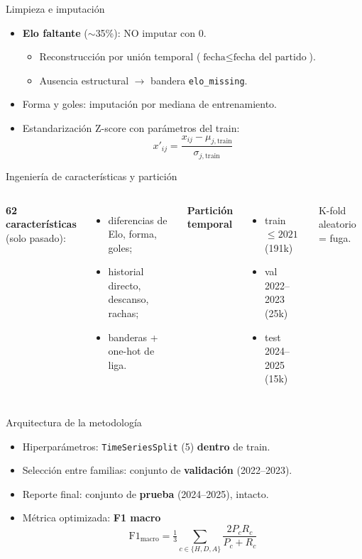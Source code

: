 \documentclass[aspectratio=169]{beamer}
\begin{document}
\begin{frame}{Limpieza e imputación}
  \begin{itemize}
    \item \textbf{Elo faltante} ($\sim$35\%): NO imputar con 0.
    \begin{itemize}
      \item Reconstrucción por unión temporal ($\text{fecha}\le\text{fecha del partido}$).
      \item Ausencia estructural $\rightarrow$ bandera \texttt{elo\_missing}.
    \end{itemize}
    \item Forma y goles: imputación por mediana de entrenamiento.
    \item Estandarización Z-score con parámetros del train:
    \[ x'_{ij}=\frac{x_{ij}-\mu_{j,\text{train}}}{\sigma_{j,\text{train}}} \]
  \end{itemize}
\end{frame}

\begin{frame}{Ingeniería de características y partición}
  \begin{columns}[t]
    \textbf{62 características} (solo pasado):
    \begin{itemize}
      \item diferencias de Elo, forma, goles;
      \item historial directo, descanso, rachas;
      \item banderas + one-hot de liga.
    \end{itemize}
    \textbf{Partición temporal}
    \begin{itemize}
      \item train $\le 2021$ (191k)
      \item val 2022--2023 (25k)
      \item test 2024--2025 (15k)
    \end{itemize}
    \alert{K-fold aleatorio = fuga.}
  \end{columns}
\end{frame}

\begin{frame}{Arquitectura de la metodología}
  \begin{itemize}
    \item Hiperparámetros: \texttt{TimeSeriesSplit} (5) \textbf{dentro} de train.
    \item Selección entre familias: conjunto de \textbf{validación} (2022--2023).
    \item Reporte final: conjunto de \textbf{prueba} (2024--2025), intacto.
    \item Métrica optimizada: \textbf{F1 macro}
    \[ \mathrm{F1}_{\text{macro}}=\tfrac{1}{3}\sum_{c\in\{H,D,A\}}\frac{2P_cR_c}{P_c+R_c} \]
  \end{itemize}
\end{frame}
\end{document}
